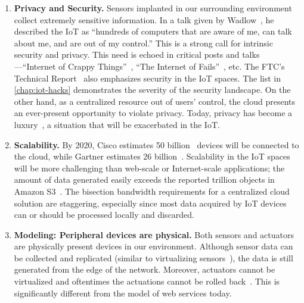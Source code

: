 \begin{enumerate}

\item \textbf{Privacy and Security.} Sensors implanted in our surrounding
  environment collect extremely sensitive information.  In a talk given by
  Wadlow~\cite{wadlow}, he described the IoT as ``hundreds of computers that are
  aware of me, can talk about me, and are out of my control.''  This is a strong
  call for intrinsic security and privacy.  This need is echoed in critical
  posts and talks---``Internet of Crappy Things''~\cite{alex2015internet}, ``The
  Internet of Fails''~\cite{stanislav2014the}, etc.  The FTC's Technical
  Report~\cite{ftc2015internet} also emphasizes security in the IoT spaces.  The
  list in \autoref{chap:iot-hacks} demonstrates the severity of the security
  landscape. On the other hand, as a centralized resource out of users' control,
  the cloud presents an ever-present opportunity to violate privacy.  Today,
  privacy has become a luxury~\cite{angwin2014has}, a situation that will be
  exacerbated in the IoT.

\item \textbf{Scalability.} By 2020, Cisco estimates 50
  billion~\cite{evans2011internet} devices will be connected to the cloud, while
  Gartner estimates 26 billion~\cite{middleton2013forecast}. Scalability in the
  IoT spaces will be more challenging than web-scale or Internet-scale
  applications; the amount of data generated easily exceeds the reported
  trillion objects in Amazon S3~\cite{barr2013amazon}. The bisection bandwidth
  requirements for a centralized cloud solution are staggering, especially since
  most data acquired by IoT devices can or should be processed locally and
  discarded.

\item \textbf{Modeling: Peripheral devices are physical.}  Both sensors and
  actuators are physically present devices in our environment.  Although sensor
  data can be collected and replicated (similar to virtualizing
  sensors~\cite{yuriyama2010sensor}), the data is still generated from the edge
  of the network.  Moreover, actuators cannot be virtualized and oftentimes the
  actuations cannot be rolled back~\cite{dawson2013boss}. This is significantly
  different from the model of web services today.


\end{enumerate}
